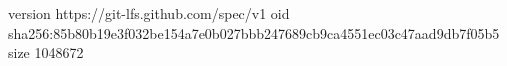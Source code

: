 version https://git-lfs.github.com/spec/v1
oid sha256:85b80b19e3f032be154a7e0b027bbb247689cb9ca4551ec03c47aad9db7f05b5
size 1048672
